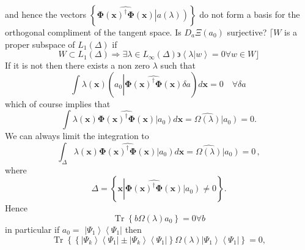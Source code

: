 \documentclass[aps,preprint]{revtex4}%
\begin{document}
and hence the vectors $\left\{  \widehat{\mathbf{\Phi}\left(  \mathbf{x}%
\right)  ^{\dagger}\mathbf{\Phi}\left(  \mathbf{x}\right)  }\left\vert
\overset{}{a\left(  \lambda\right)  }\right)  \right\}  $ do not form a basis
for the orthogonal compliment of the tangent space. Is $D_{a}\Xi\left(
a_{0}\right)  $ surjective? $\lceil W$ is a proper subspace of $L_{1}\left(
\Delta\right)  $ if
\begin{equation}
W\subset L_{1}\left(  \Delta\right)  \Rightarrow\exists\lambda\in L_{\infty
}\left(  \Delta\right)  \backepsilon\left\langle \left.  \lambda\right\vert
w\right\rangle =0\forall w\in W\rfloor
\end{equation}
If it is not then there exists a non zero $\lambda$ such that
\begin{equation}
\int\lambda\left(  \mathbf{x}\right)  \left(  a_{0}\left\vert
\widehat{\mathbf{\Phi}\left(  \mathbf{x}\right)  ^{\dagger}\mathbf{\Phi
}\left(  \mathbf{x}\right)  }\right.  \delta a\right)  d\mathbf{x}%
=0\quad\forall\delta a\,
\end{equation}
which of course implies that
\begin{equation}
\int\lambda\left(  \mathbf{x}\right)  \widehat{\mathbf{\Phi}\left(
\mathbf{x}\right)  ^{\dagger}\mathbf{\Phi}\left(  \mathbf{x}\right)
}\left\vert \overset{}{a_{0}}\right)  d\mathbf{x}=\widehat{\Omega\left(
\lambda\right)  }\left\vert \overset{}{a_{0}}\right)  =0.
\end{equation}
We can always limit the integration to
\begin{equation}
\int_{\Delta}\lambda\left(  \mathbf{x}\right)  \widehat{\mathbf{\Phi}\left(
\mathbf{x}\right)  ^{\dagger}\mathbf{\Phi}\left(  \mathbf{x}\right)
}\left\vert \overset{}{a_{0}}\right)  d\mathbf{x}=\widehat{\Omega\left(
\lambda\right)  }\left\vert \overset{}{a_{0}}\right)  =0\,,
\end{equation}
where
\begin{equation}
\Delta=\left\{  \mathbf{x}\left\vert \widehat{\mathbf{\Phi}\left(
\mathbf{x}\right)  ^{\dagger}\mathbf{\Phi}\left(  \mathbf{x}\right)
}\left\vert \overset{}{a_{0}}\right)  \neq0\right.  \right\}  .
\end{equation}
Hence
\begin{equation}
\operatorname{Tr}\left\{  b\Omega\left(  \lambda\right)  a_{0}\right\}
=0\forall b
\end{equation}
in particular if $a_{0}=$ $\left\vert \Psi_{1}\right\rangle \left\langle
\Psi_{1}\right\vert $ then
\begin{equation}
\operatorname{Tr}\left\{  \left\{  \left\vert \Psi_{k}\right\rangle
\left\langle \Psi_{1}\right\vert \pm\left\vert \Psi_{k}\right\rangle
\left\langle \Psi_{1}\right\vert \right\}  \Omega\left(  \lambda\right)
\left\vert \Psi_{1}\right\rangle \left\langle \Psi_{1}\right\vert \right\}
=0,
\end{equation}
\end{document}
